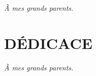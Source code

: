


{
\cleardoublepage
\thispagestyle{empty}

\vspace*{\fill}

\begin{raggedleft}
\itshape \`A mes grands parents.\\
\end{raggedleft}
\vspace*{\fill}

}
{
\chapter*{DÉDICACE}\thispagestyle{headings}
\begin{flushright}
  \itshape \`A mes grands parents.
\end{flushright}
}


